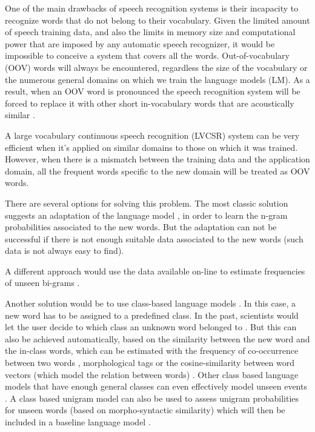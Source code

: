 \documentclass[conference]{IEEEtran}
\begin{document}
One of the main drawbacks of speech recognition systems is their incapacity to recognize words that do not belong to their vocabulary. Given the limited amount of speech training data, and also the limits in memory size and computational power that are imposed by any automatic speech recognizer, it would be impossible to conceive a system that covers all the words. Out-of-vocabulary (OOV) words will always be encountered, regardless the size of the vocabulary or the numerous general domains on which we train the language models (LM). As a result, when an OOV word is pronounced the speech recognition system will be forced to replace it with other short in-vocabulary words that are acoustically similar \cite{Young:1996, Woodland:2000, Ketabdar:2007}. 

A large vocabulary continuous speech recognition (LVCSR) system can be very efficient when it's applied on similar domains to those on which it was trained. 
However, when there is a mismatch between the training data and the application domain, all the frequent words specific to the new domain will be treated as OOV words. 

There are several options for solving this problem. The most classic solution suggests an adaptation of the language model \cite{Bellegarda:2004}, in order to learn the n-gram probabilities associated to the new words. But the adaptation can not be successful if there is not enough suitable data associated to the new words (such data is not always easy to find). 

A different approach would use the data available on-line to estimate frequencies of unseen bi-grams \cite{Keller:2003}. 

Another solution would be to use class-based language models \cite{Suhm:1994}. 
In this case, a new word has to be assigned to a predefined class. 
In the past, scientists would let the user decide to which class an unknown word belonged to \cite{Asadi:1991}. 
But this can also be achieved automatically, based on the similarity between the new word and the in-class words, which can be estimated with the frequency of co-occurrence between two words \cite{Brown:1992}, morphological tags \cite{Prazak:2007} or the cosine-similarity between word vectors (which model the relation between words) \cite{Naptali:2012}.
Other class based language models that have enough general classes can even effectively model unseen events \cite{Zitouni:2007}. 
A class based unigram model can also be used to assess unigram probabilities for unseen words (based on morpho-syntactic similarity) which will then be included in a baseline language model \cite{Martins:2008}. 
\end{document}
